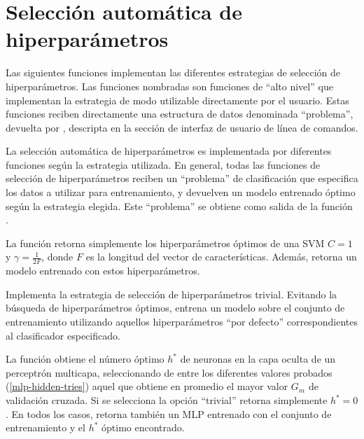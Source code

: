 \section{Selección automática de hiperparámetros}
Las siguientes funciones implementan las diferentes estrategias de
selección de hiperparámetros. Las funciones nombradas
 son funciones de ``alto nivel'' que implementan
la estrategia de modo utilizable directamente por el usuario. Estas
funciones reciben directamente una estructura de datos denominada
``problema'', devuelta por , descripta en la
sección de interfaz de usuario de línea de comandos.

La selección automática de hiperparámetros es implementada por diferentes
funciones según la estrategia utilizada. En general, todas
las funciones de selección de hiperparámetros reciben un ``problema''
de clasificación que especifica los datos a utilizar para
entrenamiento, y devuelven un modelo entrenado óptimo según la
estrategia elegida.  Este ``problema'' se obtiene como salida de la
función .

La función  retorna simplemente los
hiperparámetros óptimos de una SVM $C=1$ y $\gamma=\frac{1}{2F}$,
donde $F$ es la longitud del vector de características.  Además,
retorna un modelo entrenado con estos hiperparámetros.

Implementa la estrategia de selección de hiperparámetros trivial.
Evitando la búsqueda de hiperparámetros óptimos, entrena un modelo
sobre el conjunto de entrenamiento utilizando aquellos hiperparámetros
``por defecto'' correspondientes al clasificador especificado.

La función  obtiene el número óptimo $h^*$ de
neuronas en la capa oculta de un perceptrón multicapa, seleccionando
de entre los diferentes valores probados (\autoref{mlp-hidden-tries})
aquel que obtiene en promedio el mayor valor $G_m$ de validación
cruzada.  Si se selecciona la opción ``trivial'' retorna simplemente
$h^*=0$.  En todos los casos, retorna también un MLP entrenado con el
conjunto de entrenamiento y el $h^*$ óptimo encontrado.

